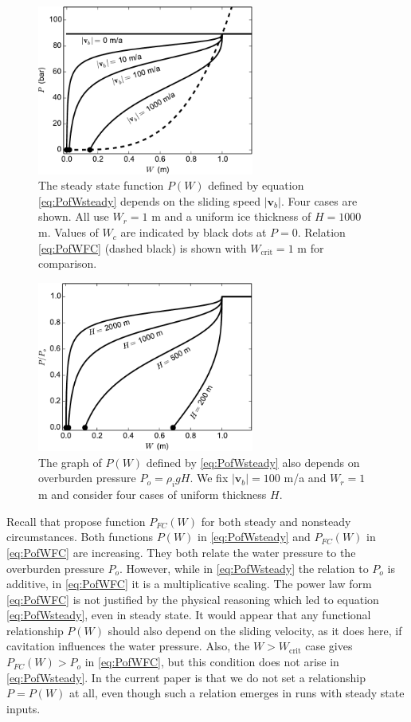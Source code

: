 \documentclass[gmd]{copernicus}   %
\newcommand{\text}{\textrm}
\newcommand\bv{\mathbf{v}}
\begin{document}
\begin{figure}[ht]
\includegraphics[width=2.8in,keepaspectratio=true]{psteady-vb}
\caption{The steady state function $P(W)$ defined by equation \eqref{eq:PofWsteady} depends on the sliding speed $|\bv_b|$.  Four cases are shown.  All use $W_r=1$ m and a uniform ice thickness of $H=1000$ m.  Values of $W_c$ are indicated by black dots at $P=0$.  Relation \eqref{eq:PofWFC} (dashed black) is shown with $W_{\text{crit}}=1$ m for comparison.}
\label{fig:psteady-vb}
\end{figure}

\begin{figure}[ht]
\includegraphics[width=2.8in,keepaspectratio=true]{psteady-Po}
\caption{The graph of $P(W)$ defined by \eqref{eq:PofWsteady} also depends on overburden pressure $P_o=\rho_i g H$.  We fix $|\bv_b|=100$ m/a and $W_r=1$ m and consider four cases of uniform thickness $H$.}
\label{fig:psteady-Po}
\end{figure}

Recall that \cite{FlowersClarke2002_theory} propose function $P_{FC}(W)$ for both steady and nonsteady circumstances.  Both functions $P(W)$ in \eqref{eq:PofWsteady} and $P_{FC}(W)$ in \eqref{eq:PofWFC} are increasing.  They both relate the water pressure to the overburden pressure $P_o$.  However, while in \eqref{eq:PofWsteady} the relation to $P_o$ is additive, in \eqref{eq:PofWFC} it is a multiplicative scaling.  The power law form \eqref{eq:PofWFC} is not justified by the physical reasoning which led to equation \eqref{eq:PofWsteady}, even in steady state.   It would appear that any functional relationship $P(W)$ should also depend on the sliding velocity, as it does here, if cavitation influences the water pressure.  Also, the $W>W_{\text{crit}}$ case gives $P_{FC}(W) > P_o$ in \eqref{eq:PofWFC}, but this condition does not arise in \eqref{eq:PofWsteady}.  In the current paper is that we do not set a relationship $P=P(W)$ at all, even though such a relation emerges in runs with steady state inputs.
\end{document}
